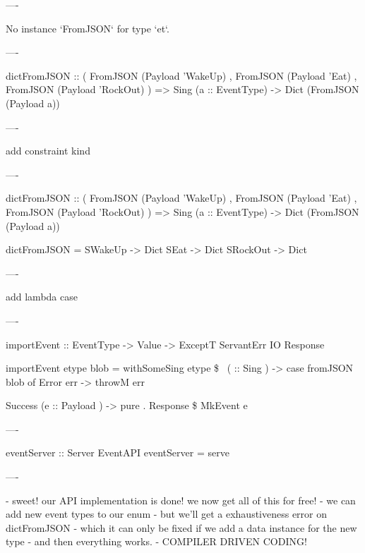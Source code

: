 ----

No instance `FromJSON` for type `et`.

----

\begin{hs}
  dictFromJSON :: ( FromJSON (Payload 'WakeUp)
                  , FromJSON (Payload 'Eat)
                  , FromJSON (Payload 'RockOut)
                  )
               => Sing (a :: EventType)
               -> Dict (FromJSON (Payload a))
\end{hs}

----

add constraint kind

----

\begin{hs}
  dictFromJSON :: ( FromJSON (Payload 'WakeUp)
                  , FromJSON (Payload 'Eat)
                  , FromJSON (Payload 'RockOut)
                  )
               => Sing (a :: EventType)
               -> Dict (FromJSON (Payload a))

  dictFromJSON = \case
    SWakeUp  -> Dict
    SEat     -> Dict
    SRockOut -> Dict
\end{hs}

----

add lambda case

----

\begin{raw}
  importEvent :: EventType
              -> Value
              -> ExceptT ServantErr IO Response

  importEvent etype blob =
    withSomeSing etype \$ \ ( :: Sing ) ->
          case fromJSON blob of
            Error err ->
              throwM err

            Success (e :: Payload ) ->
              pure . Response \$ MkEvent e
\end{raw}

----

\begin{raw}
  eventServer :: Server EventAPI
  eventServer = serve 
\end{raw}

----

- sweet! our API implementation is done! we now get all of this for free!
  - we can add new event types to our enum
  - but we'll get a exhaustiveness error on dictFromJSON
  - which it can only be fixed if we add a data instance for the new type
  - and then everything works.
  - COMPILER DRIVEN CODING!

